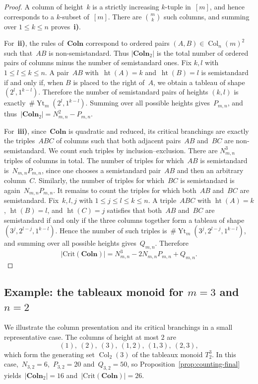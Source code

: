 \documentclass[a4paper, twoside, 11pt, english]{article}
\theoremstyle{plain}
\theoremstyle{definition}
\DeclareMathOperator{\YoungT}{Yt}
\DeclareMathOperator{\col}{Col}
\DeclareMathOperator{\height}{ht}
\newcommand{\Colo}{\mathbf{Coln}}
\begin{document}
\begin{proof}
A column of height~$k$ is a strictly increasing $k$-tuple in~$[m]$, and hence
corresponds to a $k$-subset of~$[m]$.
There are $\displaystyle \binom{m}{k}$ such columns, and summing over $1\le k\le n$ proves~{\bf i)}.

For~{\bf ii)}, the rules of~$\Colo$ correspond to ordered pairs
$(A,B)\in\col_n(m)^2$ such that~$AB$ is non-semistandard.
Thus $|\Colo_2|$ is the total number of ordered pairs of columns minus the number of semistandard ones.
Fix $k,l$ with $1\le l\le k\le n$.
A pair~$AB$ with~$\height(A)=k$ and~$\height(B)=l$ is semistandard if and only if, when $B$ is placed to the right of~$A$, we obtain a tableau of shape~$(2^l,1^{k-l})$.
Therefore the number of semistandard pairs of heights $(k,l)$ is exactly~$\displaystyle \#\YoungT_m(2^l,1^{k-l})$.
Summing over all possible heights gives~$P_{m,n}$, and thus~$|\Colo_2|=N_{m,n}^2-P_{m,n}$.


For~{\bf iii)}, since~$\Colo$ is quadratic and reduced, its critical branchings are exactly the triples~$ABC$ of columns such that both adjacent pairs~$AB$ and~$BC$ are non-semistandard.
We count such triples by inclusion--exclusion.
There are $N_{m,n}^3$ triples of columns in total.
The number of triples for which~$AB$ is semistandard is~$N_{m,n}P_{m,n}$, since one chooses a semistandard pair~$AB$ and then an arbitrary column~$C$.
Similarly, the number of triples for which~$BC$ is semistandard is again~$N_{m,n}P_{m,n}$.
It remains to count the triples for which both~$AB$ and~$BC$ are semistandard.
Fix~$k,l,j$ with $1\le j\le l\le k\le n$.
A triple~$ABC$ with $\height(A)=k$, $\height(B)=l$, and $\height(C)=j$
satisfies that both~$AB$ and~$BC$ are semistandard if and only if the three columns together form a tableau of shape~$(3^j,2^{l-j},1^{k-l})$.
Hence the number of such triples is~$\displaystyle \#\YoungT_m(3^j,2^{l-j},1^{k-l})$,
and summing over all possible heights gives~$Q_{m,n}$.
Therefore
\[|\mathrm{Crit}(\Colo)|
=
N_{m,n}^3-2N_{m,n}P_{m,n}+Q_{m,n}.
\]
\end{proof}


\subsection{Example: the tableaux monoid for $m=3$ and $n=2$}
We illustrate the column presentation and its critical branchings
in a small representative case.
The columns of height at most $2$ are
\[
(1),\ (2),\ (3),\ (1,2),\ (1,3),\ (2,3),
\]
which form the generating set $\col_2(3)$ of the tableaux monoid $T_2^3$. 
In this case,~$N_{3,2}=6$,~$P_{3,2}=20$ and~$Q_{3,2}=50$,
so Proposition~\ref{prop:counting-final} yields~$|\Colo_2|=16$ and~$|\mathrm{Crit}(\Colo)|=26$.
\end{document}
